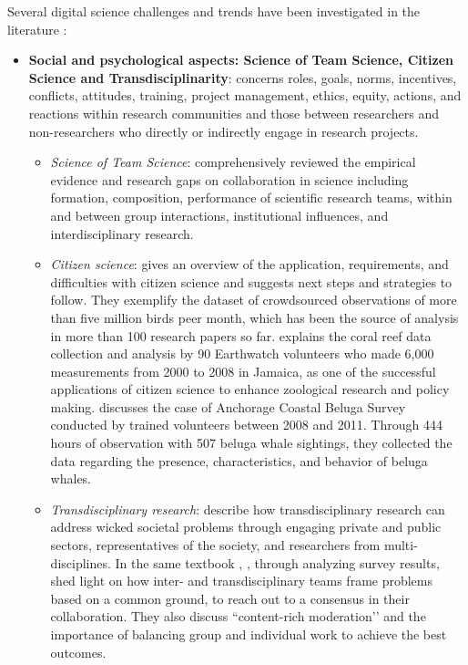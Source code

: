 \documentclass[acmsmall,authordraft]{acmart}
\begin{document}
Several digital science challenges and trends have been investigated in the literature \citet{pacheco2018digital}:
\begin{itemize}
   \item \textbf{Social and psychological aspects: Science of Team Science, Citizen Science and Transdisciplinarity}: concerns roles, goals, norms, incentives, conflicts, attitudes, training, project management, ethics, equity, actions, and reactions within research communities and those between researchers and non-researchers who directly or indirectly engage in research projects.
   \begin{itemize}
      \item \textit{Science of Team Science}: \citet{hall2018science} comprehensively reviewed the empirical evidence and research gaps on collaboration in science including formation, composition, performance of scientific research teams, within and between group interactions, institutional influences, and interdisciplinary research.
      \item \textit{Citizen science}: \citet{bonney2014next} gives an overview of the application, requirements, and difficulties with citizen science and suggests next steps and strategies to follow. They exemplify the dataset of crowdsourced observations of more than five million birds peer month, which has been the source of analysis in more than 100 research papers so far. \citet{carlson2015cook} explains the coral reef data collection and analysis by 90 Earthwatch volunteers who made 6,000 measurements from 2000 to 2008 in Jamaica, as one of the successful applications of citizen science to enhance zoological research and policy making. \citet{crabbe2012citizen} discusses the case of Anchorage Coastal Beluga Survey conducted by trained volunteers between 2008 and 2011. Through 444 hours of observation with 507 beluga whale sightings, they collected the data regarding the presence, characteristics, and behavior of beluga whales. 
      \item \textit{Transdisciplinary research}: \citet{pohl2017addressing} describe how transdisciplinary research can address wicked societal problems through engaging private and public sectors, representatives of the society, and researchers from multi-disciplines. In the same textbook \citep{frodeman2017oxford}, \citet{defila2017managing}, through analyzing survey results, shed light on how inter- and transdisciplinary teams frame problems based on a common ground, to reach out to a consensus in their collaboration. They also discuss ``content-rich moderation’’ and the importance of balancing group and individual work to achieve the best outcomes.

\end{itemize}
\end{itemize}
\end{document}
